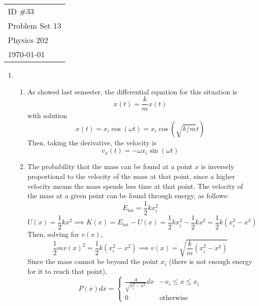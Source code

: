 \documentclass[fleqn]{article}[12pt]
\begin{document}
    \begin{tabular}{l}
        ID \#33 \\
        Problem Set 13 \\
        Physics 202 \\
        \today
    \end{tabular}

\begin{enumerate}
    \item \begin{enumerate}
        \item As showed last semester, the differential equation for this situation is
        \begin{equation*}
            \ddot{x}(t) = \frac{k}{m}x(t)
        \end{equation*}
        with solution
        \begin{equation*}
            x(t) = x_i\cos(\omega t) = x_i \cos\left(\sqrt{k/m} t\right)
        \end{equation*}
        Then, taking the derivative, the velocity is
        \begin{equation*}
            v_x(t) = -\omega x_i \sin(\omega t)
        \end{equation*}

        \item The probability that the mass can be found at a point $x$ is inversely proportional to the velocity of the mass at that point, since a higher velocity means the mass spends less time at that point. The velocity of the mass at a given point can be found through energy, as follows:
        \begin{equation*}
            E_{\text{tot}} = \frac{1}{2}kx_i^2
        \end{equation*}
        \begin{equation*}
            U(x) = \frac{1}{2}kx^2 \implies K(x) = E_\text{tot} - U(x) = \frac{1}{2}kx_i^2 - \frac{1}{2}kx^2 = \frac{1}{2}k(x_i^2-x^2)
        \end{equation*}
        Then, solving for $v(x)$,
        \begin{equation*}
            \frac{1}{2}m v(x)^2 = \frac{1}{2}k(x_i^2-x^2) \implies v(x) = \sqrt{\frac{k}{m}(x_i^2-x^2)}
        \end{equation*}
        Since the mass cannot be beyond the point $x_i$ (there is not enough energy for it to reach that point),
        \begin{equation*}
            P(x) dx = \begin{cases}
                \frac{A}{\sqrt{x_i^2-x^2}}dx & -x_i\leq x \leq x_i \\
                0 & \text{otherwise}
        \end{cases}
        \end{equation*}


\end{enumerate}
\end{enumerate}
\end{document}
